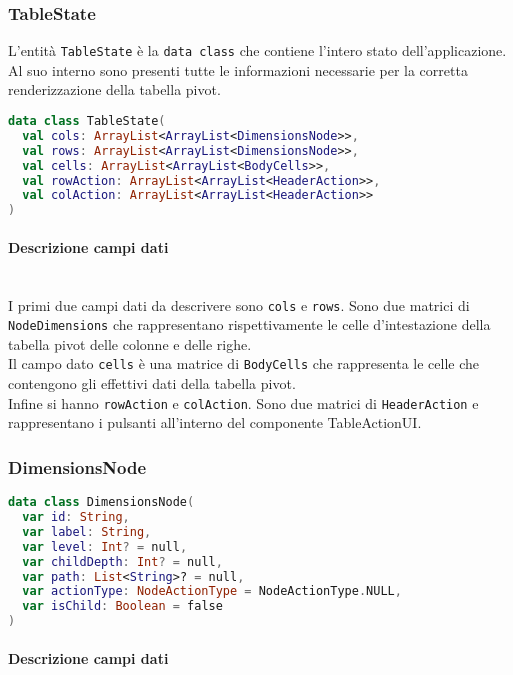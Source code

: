 \subsubsection{TableState}
L'entità \verb|TableState| è la \verb|data class| che contiene l'intero stato dell'applicazione. Al suo interno sono presenti tutte le informazioni necessarie per la corretta renderizzazione della tabella pivot.
\begin{lstlisting}[caption={TableState}, label={lst:tablestate}, language=Kotlin]
data class TableState(
  val cols: ArrayList<ArrayList<DimensionsNode>>,
  val rows: ArrayList<ArrayList<DimensionsNode>>,
  val cells: ArrayList<ArrayList<BodyCells>>,
  val rowAction: ArrayList<ArrayList<HeaderAction>>,
  val colAction: ArrayList<ArrayList<HeaderAction>>
)
\end{lstlisting}

\paragraph{Descrizione campi dati} \mbox{} \\
I primi due campi dati da descrivere sono \verb|cols| e \verb|rows|. Sono due matrici di \verb|NodeDimensions| che rappresentano rispettivamente le celle d'intestazione della tabella pivot delle colonne e delle righe.\\ 
Il campo dato \verb|cells| è una matrice di \verb|BodyCells| che rappresenta le celle che contengono gli effettivi dati della tabella pivot.\\
Infine si hanno \verb|rowAction| e \verb|colAction|. Sono due matrici di \verb|HeaderAction| e rappresentano i pulsanti all'interno del componente TableActionUI.

\noindent

\subsubsection{DimensionsNode}
\begin{lstlisting}[caption={DimensionsNode}, label={lst:dimensionsnode}, language=Kotlin]
data class DimensionsNode(
  var id: String,
  var label: String,
  var level: Int? = null,
  var childDepth: Int? = null,
  var path: List<String>? = null,
  var actionType: NodeActionType = NodeActionType.NULL,
  var isChild: Boolean = false
)
\end{lstlisting}
\paragraph{Descrizione campi dati} \mbox{} \\

